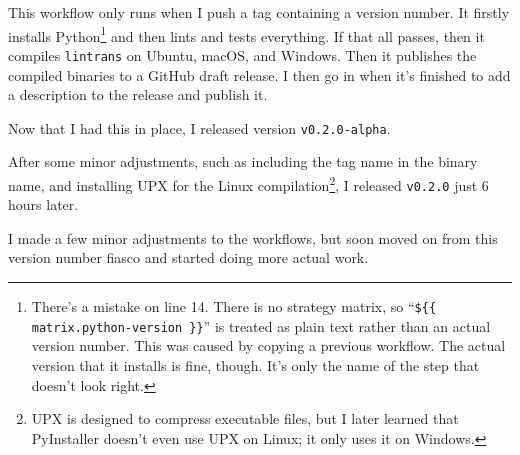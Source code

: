 \documentclass[../development.tex]{subfiles}
\begin{document}

This workflow only runs when I push a tag containing a version number. It firstly installs Python\footnote{There's a mistake on line 14. There is no strategy matrix, so \enquote{\texttt{\$\{\{ matrix.python-version \}\}}} is treated as plain text rather than an actual version number. This was caused by copying a previous workflow. The actual version that it installs is fine, though. It's only the name of the step that doesn't look right.} and then lints and tests everything. If that all passes, then it compiles \texttt{lintrans} on Ubuntu, macOS, and Windows. Then it publishes the compiled binaries to a GitHub draft release. I then go in when it's finished to add a description to the release and publish it.

Now that I had this in place, I released version \texttt{v0.2.0-alpha}.

After some minor adjustments, such as including the tag name in the binary name, and installing UPX\cite{upx-github} for the Linux compilation\footnote{UPX is designed to compress executable files, but I later learned that PyInstaller doesn't even use UPX on Linux; it only uses it on Windows.}, I released \texttt{v0.2.0} just 6 hours later.

I made a few minor adjustments to the workflows, but soon moved on from this version number fiasco and started doing more actual work.
\end{document}
